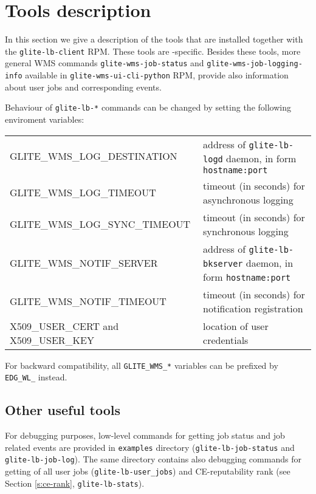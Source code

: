 \section{Tools description}
\label{s:lb-tools}

In this section we give a description of the tools that are installed
together with the \verb'glite-lb-client' RPM. These tools are \LB-specific.
Besides these tools, more general WMS commands \verb'glite-wms-job-status' 
and \verb'glite-wms-job-logging-info' available 
in \verb'glite-wms-ui-cli-python' RPM, provide also information about user jobs 
and corresponding events.

Behaviour of \verb'glite-lb-*' commands can be changed by setting the following enviroment variables:
\begin{tabularx}{\textwidth}{lX}
GLITE\_WMS\_LOG\_DESTINATION & address of \verb'glite-lb-logd' daemon, in form \verb'hostname:port'\\
GLITE\_WMS\_LOG\_TIMEOUT & timeout (in seconds) for asynchronous logging\\
GLITE\_WMS\_LOG\_SYNC\_TIMEOUT & timeout (in seconds) for synchronous logging\\
GLITE\_WMS\_NOTIF\_SERVER& address of \verb'glite-lb-bkserver' daemon, in form \verb'hostname:port'\\
GLITE\_WMS\_NOTIF\_TIMEOUT& timeout (in seconds) for notification registration\\
X509\_USER\_CERT and X509\_USER\_KEY & location of user credentials\\
\end{tabularx}
For backward compatibility, all \verb'GLITE_WMS_*' variables can be prefixed by 
\verb'EDG_WL_' instead.





\subsection{Other useful tools}
\label{glite-lb-other}

For debugging purposes, low-level commands for getting \LB job status and job related events are provided in 
\verb'examples' directory (\verb'glite-lb-job-status' and \verb'glite-lb-job-log'). The same directory
contains also debugging commands for getting of all user jobs (\verb'glite-lb-user_jobs') and
CE-reputability rank (see Section \ref{s:ce-rank}, \verb'glite-lb-stats').
